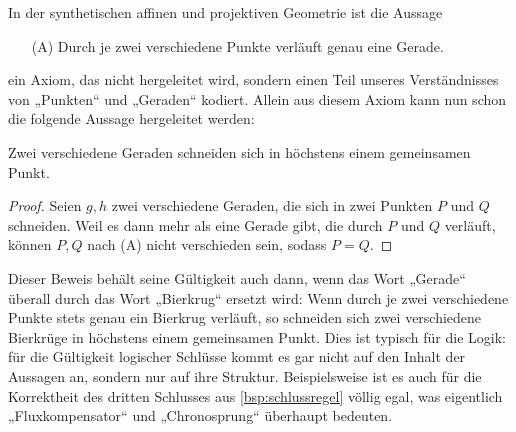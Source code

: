 \begin{bsp}[*]
    In der synthetischen affinen und projektiven Geometrie ist die Aussage
    \begin{itemize}
        \item[(A)] Durch je zwei verschiedene Punkte verläuft genau eine Gerade.
    \end{itemize}
    ein Axiom, das nicht hergeleitet wird, sondern einen Teil unseres Verständnisses von „Punkten“ und „Geraden“ kodiert. Allein aus diesem Axiom kann nun schon die folgende Aussage hergeleitet werden:
    \begin{satz}[*]
        Zwei verschiedene Geraden schneiden sich in höchstens einem gemeinsamen Punkt.
    \end{satz}
    \begin{proof}
        Seien $g,h$ zwei verschiedene Geraden, die sich in zwei Punkten $P$ und $Q$ schneiden. Weil es dann mehr als eine Gerade gibt, die durch $P$ und $Q$ verläuft, können $P,Q$ nach (A) nicht verschieden sein, sodass $P=Q$.
    \end{proof}
\end{bsp}


\begin{bem}[*]
    Dieser Beweis behält seine Gültigkeit auch dann, wenn das Wort „Gerade“ überall durch das Wort „Bierkrug“ ersetzt wird: Wenn durch je zwei verschiedene Punkte stets genau ein Bierkrug verläuft, so schneiden sich zwei verschiedene Bierkrüge in höchstens einem gemeinsamen Punkt. Dies ist typisch für die Logik: für die Gültigkeit logischer Schlüsse kommt es gar nicht auf den Inhalt der Aussagen an, sondern nur auf ihre Struktur. Beispielsweise ist es auch für die Korrektheit des dritten Schlusses aus \cref{bsp:schlussregel} völlig egal, was eigentlich „Fluxkompensator“ und „Chronosprung“ überhaupt bedeuten.
\end{bem}



